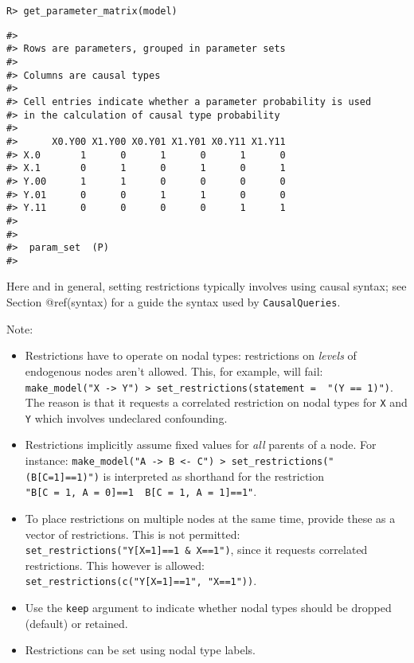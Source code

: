 \documentclass[
  11pt,
  article]{jss}
\providecommand{\tightlist}{%
  \setlength{\itemsep}{0pt}\setlength{\parskip}{0pt}}\usepackage{longtable,booktabs,array}
\begin{document}
\begin{verbatim}
R> get_parameter_matrix(model)
\end{verbatim}

\begin{verbatim}
#> 
#> Rows are parameters, grouped in parameter sets
#> 
#> Columns are causal types
#> 
#> Cell entries indicate whether a parameter probability is used
#> in the calculation of causal type probability
#> 
#>      X0.Y00 X1.Y00 X0.Y01 X1.Y01 X0.Y11 X1.Y11
#> X.0       1      0      1      0      1      0
#> X.1       0      1      0      1      0      1
#> Y.00      1      1      0      0      0      0
#> Y.01      0      0      1      1      0      0
#> Y.11      0      0      0      0      1      1
#> 
#>  
#>  param_set  (P)
#> 
\end{verbatim}

Here and in general, setting restrictions typically involves using
causal syntax; see Section @ref(syntax) for a guide the syntax used by
\texttt{CausalQueries}.

Note:

\begin{itemize}
\tightlist
\item
  Restrictions have to operate on nodal types: restrictions on
  \emph{levels} of endogenous nodes aren't allowed. This, for example,
  will fail:
  \texttt{make\_model("X\ -\textgreater{}\ Y")\ \textbar{}\textgreater{}\ set\_restrictions(statement\ =\ \ "(Y\ ==\ 1)")}.
  The reason is that it requests a correlated restriction on nodal types
  for \texttt{X} and \texttt{Y} which involves undeclared confounding.
\item
  Restrictions implicitly assume fixed values for \emph{all} parents of
  a node. For instance:
  \texttt{make\_model("A\ -\textgreater{}\ B\ \textless{}-\ C")\ \textbar{}\textgreater{}\ set\_restrictions("(B{[}C=1{]}==1)")}
  is interpreted as shorthand for the restriction
  \texttt{"B{[}C\ =\ 1,\ A\ =\ 0{]}==1\ \textbar{}\ B{[}C\ =\ 1,\ A\ =\ 1{]}==1"}.
\item
  To place restrictions on multiple nodes at the same time, provide
  these as a vector of restrictions. This is not permitted:
  \texttt{set\_restrictions("Y{[}X=1{]}==1\ \&\ X==1")}, since it
  requests correlated restrictions. This however is allowed:
  \texttt{set\_restrictions(c("Y{[}X=1{]}==1",\ "X==1"))}.\\
\item
  Use the \texttt{keep} argument to indicate whether nodal types should
  be dropped (default) or retained.
\item
  Restrictions can be set using nodal type labels.
\end{itemize}
\end{document}
